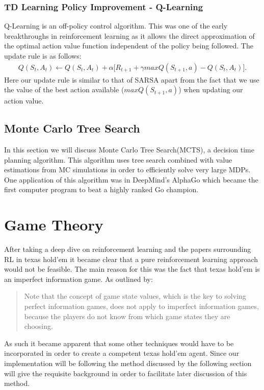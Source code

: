 \subsubsection{TD Learning Policy Improvement - Q-Learning}
Q-Learning is an off-policy control algorithm.
This was one of the early breakthroughs in reinforcement learning as it allows the direct approximation of
the optimal action value function independent of the policy being followed.
The update rule is as follows:
\begin{align}
    Q(S_t, A_t) \leftarrow Q(S_t, A_t) + \alpha \lbrack R_{t+1} + \gamma maxQ(S_{t+1}, a) - Q(S_t, A_t) \rbrack.
\end{align}
Here our update rule is similar to that of SARSA apart from the fact that we use the value of the best
action available ($maxQ(S_{t+1}, a)$) when updating our action value.

\subsection{Monte Carlo Tree Search}\label{subsec:mcts}
In this section we will discuss Monte Carlo Tree Search(MCTS), a decision time planning algorithm.
This algorithm uses tree search combined with value estimations from MC simulations in order to
efficiently solve very large MDPs.
One application of this algorithm was in DeepMind's AlphaGo\citep{silver2016mastering} which became the
first computer program to beat a highly ranked Go champion.



\section{Game Theory}\label{sec:gameTheory}
After taking a deep dive on reinforcement learning and the papers surrounding RL in texas hold'em it became
clear that a pure reinforcement learning approach would not be feasible.
The main reason for this was the fact that texas hold'em is an imperfect information game.
As outlined by\citep{dahl2001reinforcement}:
\begin{quotation}
Note that the concept of game state values, which is the key to solving perfect information games,
does not apply to imperfect information games, because the players do not know from  which game states they
are choosing.
\end{quotation}
As such it became apparent that some other techniques would have to be incorporated in order to create a competent
texas hold'em agent.
Since our implementation will be following the method discussed by\citep{heinrich2017reinforcement}
the following section will give the requisite background in order to facilitate later discussion of this method.

